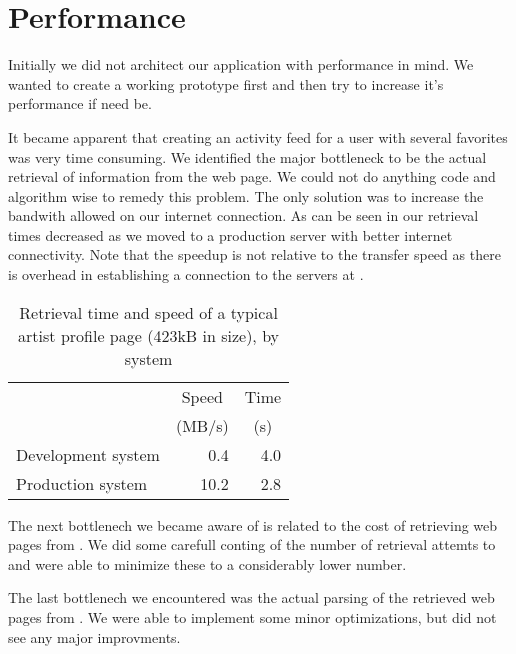 \section{Performance}
\label{section:implementation.performance}

Initially we did not architect our application with performance in mind. We
wanted to create a working prototype first and then try to increase it's
performance if need be.

It became apparent that creating an activity feed for a user with several
favorites was very time consuming. We identified the major bottleneck to be
the actual retrieval of information from the \urort{} web page. We could not
do anything code and algorithm wise to remedy this problem. The only solution
was to increase the bandwith allowed on our internet connection.
As can be seen in
our retrieval times decreased as we moved to a production server with
better internet connectivity. Note that the speedup is not relative to
the transfer speed as there is overhead in establishing a connection
to the servers at \urort{}.

\begin{table}
  \begin{tabular}{lrr}

    &
    \multicolumn{1}{c}{Speed} &
    \multicolumn{1}{c}{Time} \\

    &
    \multicolumn{1}{c}{(MB/s)} &
    \multicolumn{1}{c}{(s)} \\

    \cmidrule(lr){2-2}
    \cmidrule(lr){3-3}

    Development system &
    0.4 &
    4.0 \\

    Production system &
    10.2 &
    2.8 \\

  \end{tabular}
  \caption[Retrieval Time and Speed]{%
    Retrieval time and speed of a typical artist profile page (423kB in size),
    by system}
  \label{table:retrieval.time.and.speed}
\end{table}

The next bottlenech we became aware of is related to the cost of retrieving
web pages from \urort{}. We did some carefull conting of the number of
retrieval attemts to \urort{} and were able to minimize these to a
considerably lower number.

The last bottlenech we encountered was the actual parsing of the retrieved web
pages from \urort{}. We were able to implement some minor optimizations, but
did not see any major improvments.


